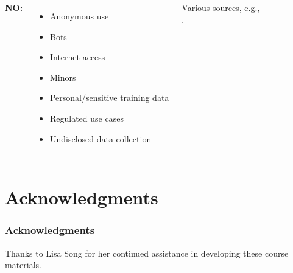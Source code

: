 \documentclass[11pt,
               aspectratio=169,
               hyperref={colorlinks}
               ]{beamer}
\begin{document}
\begin{frame}
\begin{columns}
					\textbf{NO:}
					\begin{itemize}\small
						\item Anonymous use
						\item Bots
						\item Internet access
						\item Minors
						\item Personal/sensitive training data
						\item Regulated use cases
						\item Undisclosed data collection
					\end{itemize}
					\vspace{5pt}
					\scriptsize{Various sources, e.g.,\\ \cite{weidinger2022taxonomy}.}
					
					
				
			\end{columns}
					
		\end{frame}


\section{Acknowledgments} 

\begin{frame}
	
	\frametitle{Acknowledgments}
	
	Thanks to Lisa Song for her continued assistance in developing these course materials.
	
\end{frame}	





			
\end{document}
